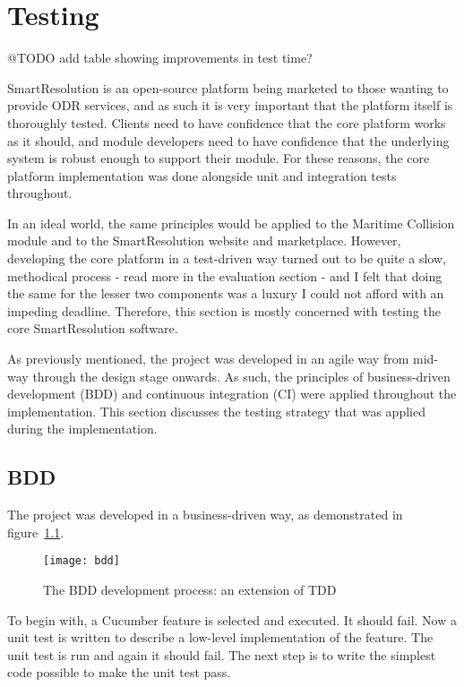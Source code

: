 \chapter{Testing} 

@TODO add table showing improvements in test time?

SmartResolution is an open-source platform being marketed to those wanting to provide ODR services, and as such it is very important that the platform itself is thoroughly tested. Clients need to have confidence that the core platform works as it should, and module developers need to have confidence that the underlying system is robust enough to support their module. For these reasons, the core platform implementation was done alongside unit and integration tests throughout.

In an ideal world, the same principles would be applied to the Maritime Collision module and to the SmartResolution website and marketplace. However, developing the core platform in a test-driven way turned out to be quite a slow, methodical process - read more in the evaluation section - and I felt that doing the same for the lesser two components was a luxury I could not afford with an impeding deadline. Therefore, this section is mostly concerned with testing the core SmartResolution software.

As previously mentioned, the project was developed in an agile way from mid-way through the design stage onwards. As such, the principles of business-driven development (BDD) and continuous integration (CI) were applied throughout the implementation. This section discusses the testing strategy that was applied during the implementation.

\section{BDD}

The project was developed in a business-driven way, as demonstrated in figure~\ref{uml:bdd}.

\begin{figure}[h!]
  \centering
    \ifimages
    \texttt{[image: bdd]}
    \fi
  \caption{The BDD development process: an extension of TDD}
  \label{uml:bdd}
\end{figure}

To begin with, a Cucumber feature is selected and executed. It should fail. Now a unit test is written to describe a low-level implementation of the feature. The unit test is run and again it should fail. The next step is to write the simplest code possible to make the unit test pass.

